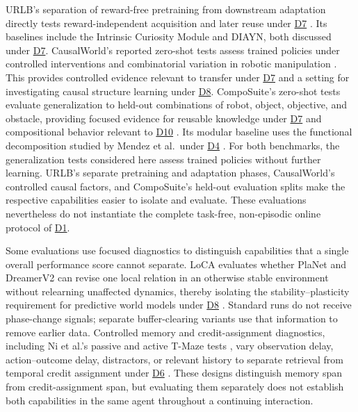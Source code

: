 \documentclass[10pt,journal,compsoc]{IEEEtran}
\DeclareRobustCommand{\Dref}[1]{\hyperref[sec:d#1]{D#1}}
\begin{document}
URLB's separation of reward-free pretraining from downstream adaptation directly tests reward-independent acquisition and later reuse under \Dref{7} \cite{laskin2021}.
Its baselines include the Intrinsic Curiosity Module and DIAYN, both discussed under \Dref{7}.
CausalWorld's reported zero-shot tests assess trained policies under controlled interventions and combinatorial variation in robotic manipulation \cite{ahmed2021}.
This provides controlled evidence relevant to transfer under \Dref{7} and a setting for investigating causal structure learning under \Dref{8}.
CompoSuite's zero-shot tests evaluate generalization to held-out combinations of robot, object, objective, and obstacle, providing focused evidence for reusable knowledge under \Dref{7} and compositional behavior relevant to \Dref{10} \cite{mendez2022a}.
Its modular baseline uses the functional decomposition studied by Mendez et al.\ under \Dref{4} \cite{mendez2022a,mendez2022b}.
For both benchmarks, the generalization tests considered here assess trained policies without further learning.
URLB's separate pretraining and adaptation phases, CausalWorld's controlled causal factors, and CompoSuite's held-out evaluation splits make the respective capabilities easier to isolate and evaluate.
These evaluations nevertheless do not instantiate the complete task-free, non-episodic online protocol of \Dref{1}.

Some evaluations use focused diagnostics to distinguish capabilities that a single overall performance score cannot separate.
LoCA evaluates whether PlaNet and DreamerV2 can revise one local relation in an otherwise stable environment without relearning unaffected dynamics, thereby isolating the stability--plasticity requirement for predictive world models under \Dref{8} \cite{wan2022}.
Standard runs do not receive phase-change signals; separate buffer-clearing variants use that information to remove earlier data.
Controlled memory and credit-assignment diagnostics, including Ni et al.'s passive and active T-Maze tests \cite{ni2023}, vary observation delay, action--outcome delay, distractors, or relevant history to separate retrieval from temporal credit assignment under \Dref{6} \cite{pignatelli2024}.
These designs distinguish memory span from credit-assignment span, but evaluating them separately does not establish both capabilities in the same agent throughout a continuing interaction.
\end{document}
